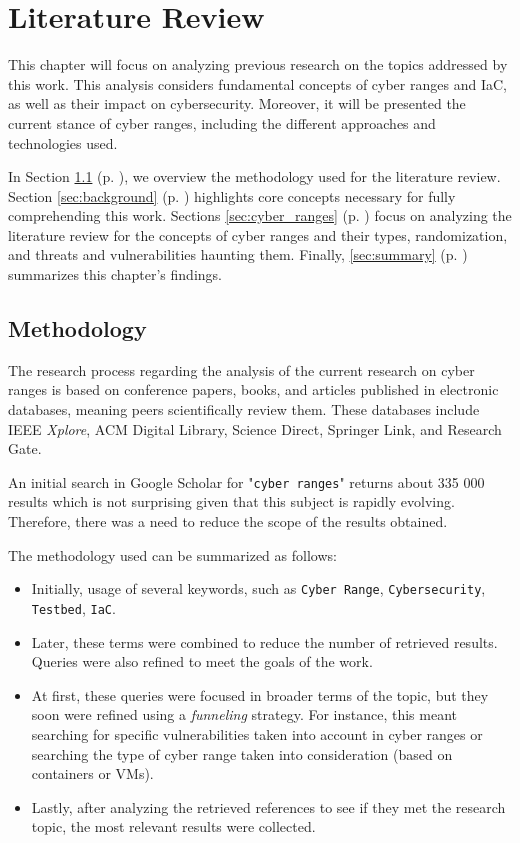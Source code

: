 \chapter{Literature Review} \label{chap:sota}

\minitoc

This chapter will focus on analyzing previous research on the topics addressed by this work. This analysis considers fundamental concepts of cyber ranges and IaC, as well as their impact on cybersecurity. Moreover, it will be presented the current stance of cyber ranges, including the different approaches and technologies used.

In Section \ref{sec:methodology} (p. \pageref{sec:methodology}), we overview the methodology used for the literature review. Section \ref{sec:background} (p. \pageref{sec:background}) highlights core concepts necessary for fully comprehending this work. Sections \ref{sec:cyber_ranges} (p. \pageref{sec:cyber_ranges}) focus on analyzing the literature review for the concepts of cyber ranges and their types, randomization, and threats and vulnerabilities haunting them. Finally, \ref{sec:summary} (p. \pageref{sec:summary}) summarizes this chapter's findings.

\section{Methodology} \label{sec:methodology}

The research process regarding the analysis of the current research on cyber ranges is based on conference papers, books, and articles published in electronic databases, meaning peers scientifically review them. These databases include IEEE \textit{Xplore}, ACM Digital Library, Science Direct, Springer Link, and Research Gate.

An initial search in Google Scholar for "\texttt{cyber ranges}" returns about 335 000 results which is not surprising given that this subject is rapidly evolving. Therefore, there was a need to reduce the scope of the results obtained.

The methodology used can be summarized as follows:

\begin{itemize}
    \item Initially, usage of several keywords, such as \texttt{Cyber Range}, \texttt{Cybersecurity}, \texttt{Testbed}, \texttt{IaC}.
    \item Later, these terms were combined to reduce the number of retrieved results. Queries were also refined to meet the goals of the work.
    \item At first, these queries were focused in broader terms of the topic, but they soon were refined using a \textit{funneling} strategy. For instance, this meant searching for specific vulnerabilities taken into account in cyber ranges or searching the type of cyber range taken into consideration (based on containers or VMs).
    \item Lastly, after analyzing the retrieved references to see if they met the research topic, the most relevant results were collected.
\end{itemize}

